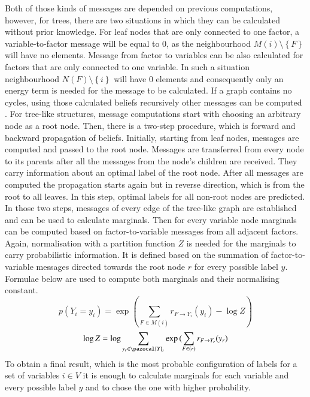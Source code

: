Both of those kinds of messages are depended on previous computations, however, for trees, there are two situations in which they can be calculated without prior knowledge. For leaf nodes that are only connected to one factor, a variable-to-factor message will be equal to 0, as the neighbourhood $M(i)\setminus{\left \{ F \right \}}$ will have no elements. Message from factor to variables can be also calculated for factors that are only connected to one variable. In such a situation neighbourhood $N(F)\setminus{\left \{ i \right \}}$ will have 0 elements and consequently only an energy term is needed for the message to be calculated. If a graph contains no cycles, using those calculated beliefs recursively other messages can be computed \cite{lbp}. For tree-like structures, message computations start with choosing an arbitrary node as a root node. Then, there is a two-step procedure, which is forward and backward propagation of beliefs. Initially, starting from leaf nodes, messages are computed and passed to the root node. Messages are transferred from every node to its parents after all the messages from the node’s children are received. They carry information about an optimal label of the root node. After all messages are computed the propagation starts again but in reverse direction, which is from the root to all leaves. In this step, optimal labels for all non-root nodes are predicted. In those two steps, messages of every edge of the tree-like graph are established and can be used to calculate marginals. Then for every variable node marginals can be computed based on factor-to-variable messages from all adjacent factors. Again, normalisation with a partition function $Z$ is needed for the marginals to carry probabilistic information. It is defined based on the summation of factor-to-variable messages directed towards the root node $r$ for every possible label $y$. Formulae below are used to compute both marginals and their normalising constant.
\begin{equation}
    p(Y_i = y_i) = \exp{(\sum_{F \in M(i)}{r_{F\rightarrow Y_i}(y_i)} - \log{Z})}
\end{equation}
\begin{equation}
    \log{Z} = \log{\sum_{y_r \in \pazocal{Y}_r}{
         \exp{(\sum_{F \in (r)}{r_{F\rightarrow Y_r}(y_r)}
     }}}
\end{equation}
To obtain a final result, which is the most probable configuration of labels for a set of variables $i \in V$ it is enough to calculate marginals for each variable and every possible label $y$ and to chose the one with higher probability.

